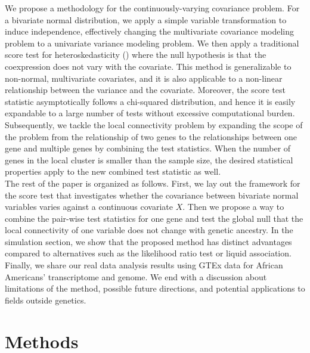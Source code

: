 \documentclass[aap,authoryear, preprint]{imsart}
\numberwithin{equation}{section}
\theoremstyle{plain}
\begin{document}
We propose a methodology for the continuously-varying covariance problem. For a bivariate normal distribution, we apply a simple variable transformation to induce independence, effectively changing the multivariate covariance modeling problem to a univariate variance modeling problem. We then apply a traditional score test for heteroskedasticity (\cite{breusch1979simple}) where the null hypothesis is that the coexpression does not vary with the covariate. This method is generalizable to non-normal, multivariate covariates, and it is also applicable to a non-linear relationship between the variance and the covariate. Moreover, the score test statistic asymptotically follows a chi-squared distribution, and hence it is easily expandable to a large number of tests without excessive computational burden. Subsequently, we tackle the local connectivity problem by expanding the scope of the problem from the relationship of two genes to the relationships between one gene and multiple genes by combining the test statistics. When the number of genes in the local cluster is smaller than the sample size, the desired statistical properties apply to the new combined test statistic as well. \\

The rest of the paper is organized as follows. First, we lay out the framework for the score test that investigates whether the covariance between bivariate normal variables varies against a continuous covariate $X$. Then we propose a way to combine the pair-wise test statistics for one gene and test the global null that the local connectivity of one variable does not change with genetic ancestry. In the simulation section, we show that the proposed method has distinct advantages compared to alternatives such as the likelihood ratio test or liquid association. Finally, we share our real data analysis results using GTEx data for African Americans' transcriptome and genome. We end with a discussion about limitations of the method, possible future directions, and potential applications to fields outside genetics.


\section{Methods}
\end{document}
